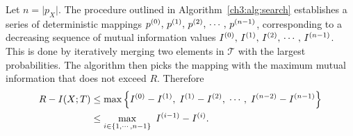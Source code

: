 Let $n=\vert p_X\vert$. The procedure outlined in Algorithm~\ref{ch3:alg:search} establishes a series of deterministic mappings
$ p^{(0)},\, p^{(1)},\, p^{(2)},\, \cdots,\, p^{(n-1)}$,
corresponding to a decreasing sequence of mutual information values 
$ I^{(0)},\, I^{(1)},\, I^{(2)},\, \cdots,\, I^{(n-1)}$. 
This is done by iteratively merging two elements in $\mathcal{T}$ with the largest probabilities.
The algorithm then picks the mapping with the maximum mutual information that does not exceed $R$. Therefore
\begin{align}
    R - I(X;T) 
    &\leq \max \left\{ I^{(0)} - I^{(1)},\; I^{(1)} - I^{(2)},\; \cdots,\; I^{(n-2)} - I^{(n-1)} \right\} \nonumber \\
    &\leq \max\limits_{i\in \{1,\cdots,n-1\}}\  I^{(i-1)} - I^{(i)} . \label{ch3:eq:detmapbound}
\end{align}    

